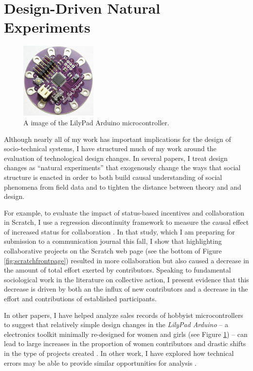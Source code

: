 \documentclass[10pt]{memoir}
\begin{document}
\section{Design-Driven Natural Experiments}

\begin{figure}
 \begin{centering}
 \includegraphics[width=1.5in]{figures/lilypad.png}
 \caption{A image of the LilyPad Arduino microcontroller.}
 \label{fig:lilypad}
 \end{centering}
\end{figure}

Although nearly all of my work has important implications for the
design of socio-technical systems, I have structured much of my work
around the evaluation of technological design changes. In several papers, I
treat design changes as ``natural experiments'' that
exogenously change the ways that social structure is enacted in order
to both build causal understanding of social phenomena from field data and to tighten the
distance between theory and and design.

For example, to evaluate the impact of status-based incentives and
collaboration in Scratch, I use a regression discontinuity framework
to measure the causal effect of increased status for collaboration
\cite{hill_causal_2012}. In that study, which I am preparing for
submission to a communication journal this fall, I show that
highlighting collaborative projects on the Scratch web page (see the
bottom of Figure \ref{fig:scratchfrontpage}) resulted in more
collaboration but also caused a decrease in the amount of total effort
exerted by contributors. Speaking to fundamental sociological work in
the literature on collective action, I present evidence that this
decrease is driven by both an the influx of new contributors and a
decrease in the effort and contributions of established participants.

In other papers, I have helped analyze sales records of hobbyist
microcontrollers to suggest that relatively simple design changes in
the \emph{LilyPad Arduino} -- a electronics toolkit minimally
re-designed for women and girls (see Figure \ref{fig:lilypad}) -- can
lead to large increases in the proportion of women contributors and
drastic shifts in the type of projects created
\cite{buechley_lilypad_2010}. In other work, I have explored how
technical errors may be able to provide similar opportunities for
analysis \cite{hill_revealing_2010}.
\end{document}
